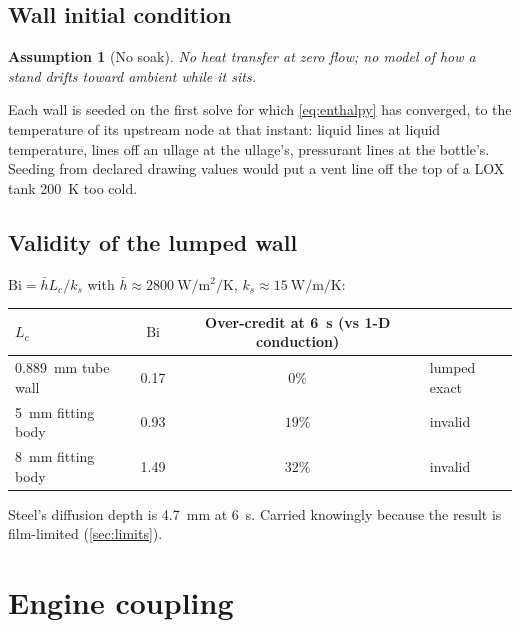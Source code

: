 \documentclass[11pt,a4paper]{article}
\newtheorem{assumption}{Assumption}
\begin{document}
\subsection{Wall initial condition}
\begin{assumption}[No soak]\label{as:soak}
No heat transfer at zero flow; no model of how a stand drifts toward ambient
while it sits.
\end{assumption}
Each wall is seeded on the first solve for which \cref{eq:enthalpy} has
converged, to the temperature of its upstream node at that instant:
liquid lines at liquid temperature, lines off an ullage at the ullage's,
pressurant lines at the bottle's. Seeding from declared drawing values would put
a vent line off the top of a LOX tank \SI{200}{\kelvin} too cold.

\subsection{Validity of the lumped wall}\label{sec:biot}
$\mathrm{Bi}=\bar hL_c/k_s$ with $\bar h\approx\SI{2800}{\watt\per\square\metre\per\kelvin}$,
$k_s\approx\SI{15}{\watt\per\metre\per\kelvin}$:
\begin{center}
\begin{tabular}{lccl}
\toprule
$L_c$ & $\mathrm{Bi}$ & Over-credit at \SI{6}{\second} (vs 1-D conduction) & \\
\midrule
\SI{0.889}{\milli\metre} tube wall & 0.17 & $0\%$ & lumped exact \\
\SI{5}{\milli\metre} fitting body & 0.93 & $19\%$ & invalid \\
\SI{8}{\milli\metre} fitting body & 1.49 & $32\%$ & invalid \\
\bottomrule
\end{tabular}
\end{center}
Steel's diffusion depth is \SI{4.7}{\milli\metre} at \SI{6}{\second}. Carried
knowingly because the result is film-limited (\cref{sec:limits}).

\section{Engine coupling}\label{sec:engine}
\end{document}
